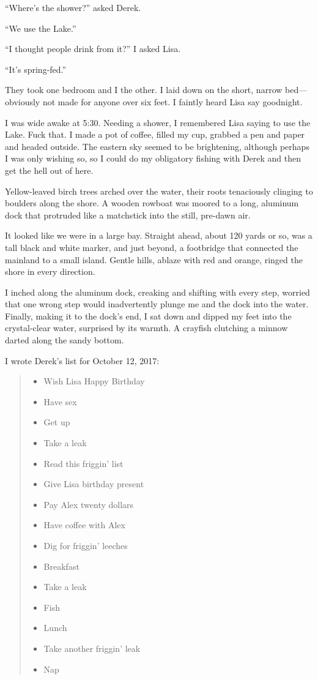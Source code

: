 ``Where's the shower?'' asked Derek.

``We use the Lake.''

``I thought people drink from it?'' I asked Lisa.

``It's spring-fed.''

They took one bedroom and I the other. I laid down on the short, narrow
bed---obviously not made for anyone over six feet. I faintly heard Lisa
say goodnight.

I was wide awake at 5:30. Needing a shower, I remembered Lisa saying to
use the Lake. Fuck that. I made a pot of coffee, filled my cup, grabbed
a pen and paper and headed outside. The eastern sky seemed to be
brightening, although perhaps I was only wishing so, so I could do my
obligatory fishing with Derek and then get the hell out of here.

Yellow-leaved birch trees arched over the water, their roots tenaciously
clinging to boulders along the shore. A wooden rowboat was moored to a
long, aluminum dock that protruded like a matchstick into the still,
pre-dawn air.

It looked like we were in a large bay. Straight ahead, about 120 yards
or so, was a tall black and white marker, and just beyond, a footbridge
that connected the mainland to a small island. Gentle hills, ablaze with
red and orange, ringed the shore in every direction.

I inched along the aluminum dock, creaking and shifting with every step,
worried that one wrong step would inadvertently plunge me and the dock
into the water. Finally, making it to the dock's end, I sat down and
dipped my feet into the crystal-clear water, surprised by its warmth. A
crayfish clutching a minnow darted along the sandy bottom.

I wrote Derek's list for October 12, 2017:

\begin{quote}
\begin{itemize}
\tightlist
\item
  Wish Lisa Happy Birthday
\item
  Have sex
\item
  Get up
\item
  Take a leak
\item
  Read this friggin' list
\item
  Give Lisa birthday present
\item
  Pay Alex twenty dollars
\item
  Have coffee with Alex
\item
  Dig for friggin' leeches
\item
  Breakfast
\item
  Take a leak
\item
  Fish
\item
  Lunch
\item
  Take another friggin' leak
\item
  Nap
\end{itemize}
\end{quote}

